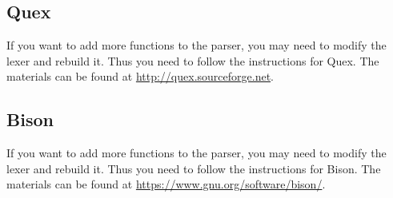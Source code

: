 \documentclass{article}
\begin{document}
\subsection*{Quex}
If you want to add more functions to the parser, you may need to modify the lexer and rebuild it.
Thus you need to follow the instructions for Quex.
The materials can be found at \url{http://quex.sourceforge.net}.

\subsection*{Bison}
If you want to add more functions to the parser, you may need to modify the lexer and rebuild it.
Thus you need to follow the instructions for Bison.
The materials can be found at \url{https://www.gnu.org/software/bison/}.
\end{document}
